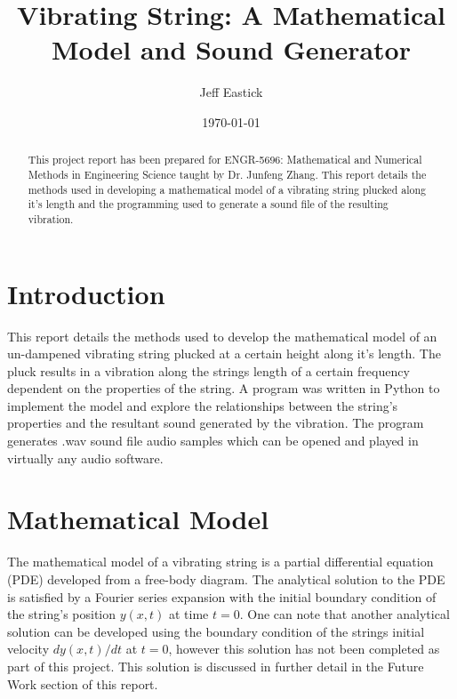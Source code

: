 \documentclass[%
 reprint,
 amsmath,amssymb,
 aps,
]{revtex4-1}
\begin{document}
\title{Vibrating String: A Mathematical Model and Sound Generator}


\author{Jeff Eastick}


\date{\today}%

\begin{abstract}
This project report has been prepared for ENGR-5696: Mathematical and Numerical Methods in Engineering Science taught by Dr. Junfeng Zhang. This report details the methods used in developing a mathematical model of a vibrating string plucked along it's length and the programming used to generate a sound file of the resulting vibration.

\end{abstract}


\maketitle


\section{\label{sec:level1}Introduction}
This report details the methods used to develop the mathematical model of an un-dampened vibrating string plucked at a certain height along it's length. The pluck results in a vibration along the strings length of a certain frequency dependent on the properties of the string. 
A program was written in Python to implement the model and explore the relationships between the string's properties and the resultant sound generated by the vibration. The program generates .wav sound file audio samples which can be opened and played in virtually any audio software. \par

\section{\label{sec:level1}Mathematical Model}
The mathematical model of a vibrating string is a partial differential equation (PDE) developed from a free-body diagram. The analytical solution to the PDE is satisfied by a Fourier series expansion with the initial boundary condition of the string's position \(y(x,t)\) at time \(t = 0\). One can note that another analytical solution can be developed using the boundary condition of the strings initial velocity \(dy(x,t)/dt\) at \(t = 0\), however this solution has not been completed as part of this project. This solution is discussed in further detail in the Future Work section of this report.
\end{document}
